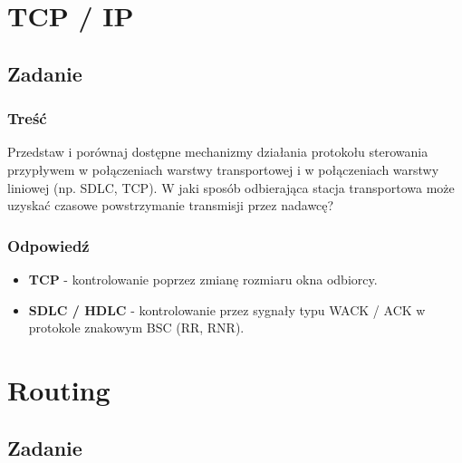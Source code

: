 \documentclass[a4paper,twoside]{article}
\begin{document}
\section{TCP / IP}
\subsection{Zadanie}
\subsubsection{Treść}
Przedstaw i porównaj dostępne mechanizmy działania protokołu sterowania przypływem w połączeniach warstwy transportowej i w połączeniach warstwy liniowej (np. SDLC, TCP). W jaki sposób odbierająca stacja transportowa może uzyskać czasowe powstrzymanie transmisji przez nadawcę?
\subsubsection{Odpowiedź}
\begin{itemize}
	\item \textbf{TCP} - kontrolowanie poprzez zmianę rozmiaru okna odbiorcy.
	\item \textbf{SDLC / HDLC} - kontrolowanie przez sygnały typu WACK / ACK w protokole znakowym BSC (RR, RNR).
\end{itemize}



\section{Routing}
\subsection{Zadanie}
\end{document}
